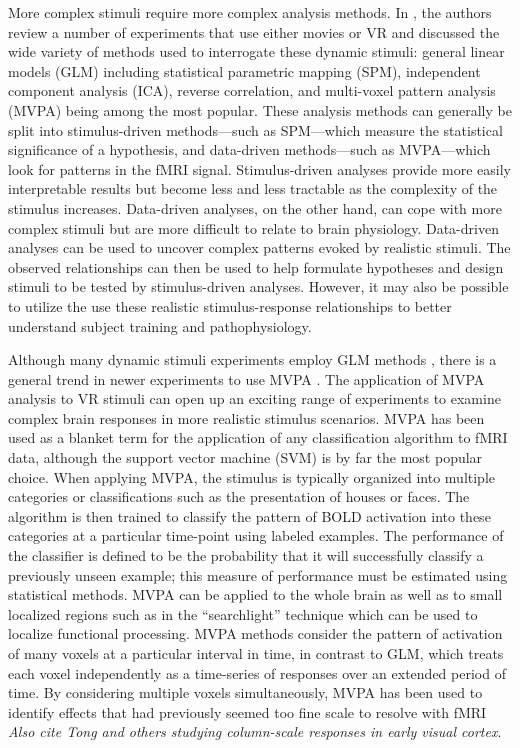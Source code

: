 \documentclass[preprint,5p,authoryear]{elsarticle}
\begin{document}
More complex stimuli require more complex analysis methods.
In \cite{Spiers2007}, the authors review a number of experiments that use either movies or VR and discussed the wide variety of methods used to interrogate these dynamic stimuli: general linear models (GLM) including statistical parametric mapping (SPM), independent component analysis (ICA), reverse correlation, and multi-voxel pattern analysis (MVPA) being among the most popular.
These analysis methods can generally be split into stimulus-driven methods---such as SPM---which measure the statistical significance of a hypothesis, and data-driven methods---such as MVPA---which look for patterns in the fMRI signal.
Stimulus-driven analyses provide more easily interpretable results but become less and less tractable as the complexity of the stimulus increases.
Data-driven analyses, on the other hand, can cope with more complex stimuli but are more difficult to relate to brain physiology.
Data-driven analyses can be used to uncover complex patterns evoked by realistic stimuli. The observed relationships can then be used to help formulate hypotheses and design stimuli to be tested by stimulus-driven analyses. However, it may also be possible to utilize the use these realistic stimulus-response relationships to better understand subject training and pathophysiology.

Although many dynamic stimuli experiments employ GLM methods \citep{Maguire1998,Calhoun2002,King2006,Mathiak2006,Spiers2007a}, there is a general trend in newer experiments to use MVPA \citep{Hassabis2009,Chadwick2010,Haxby2001,Mitchell2003,Haynes2006}. The application of MVPA analysis to VR stimuli can open up an exciting range of experiments to examine complex brain responses in more realistic stimulus scenarios.
MVPA has been used as a blanket term for the application of any classification algorithm to fMRI data, although the support vector machine (SVM) is by far the most popular choice.
When applying MVPA, the stimulus is typically organized into multiple categories or classifications such as the presentation of houses or faces.
The algorithm is then trained to classify the pattern of BOLD activation into these categories at a particular time-point using labeled examples.
The performance of the classifier is defined to be the probability that it will successfully classify a previously unseen example;
this measure of performance must be estimated using statistical methods.
MVPA can be applied to the whole brain as well as to small localized regions such as in the ``searchlight'' technique \citep{searchlight} which can be used to localize functional processing.
MVPA methods consider the pattern of activation of many voxels at a particular interval in time, in contrast to GLM, which treats each voxel independently as a time-series of responses over an extended period of time.
By considering multiple voxels simultaneously, MVPA has been used to identify effects that had previously seemed too fine scale to resolve with fMRI \citep{Hassabis2009} \emph{Also cite Tong and others studying column-scale responses in early visual cortex}.
\end{document}

